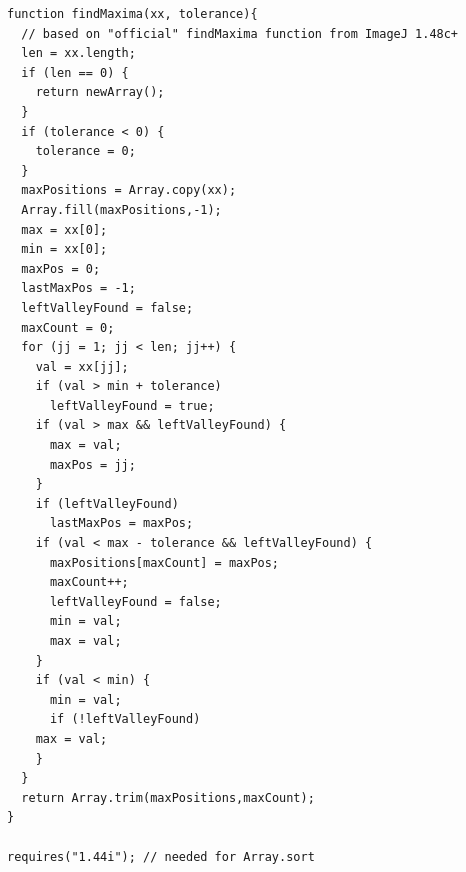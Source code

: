 \documentclass[a4paper]{scrartcl}
\begin{document}
\begin{Verbatim}
function findMaxima(xx, tolerance){
  // based on "official" findMaxima function from ImageJ 1.48c+
  len = xx.length;
  if (len == 0) {
    return newArray();
  }
  if (tolerance < 0) {
    tolerance = 0;
  }
  maxPositions = Array.copy(xx);
  Array.fill(maxPositions,-1);
  max = xx[0];
  min = xx[0];
  maxPos = 0;
  lastMaxPos = -1;
  leftValleyFound = false;
  maxCount = 0;
  for (jj = 1; jj < len; jj++) {
    val = xx[jj];
    if (val > min + tolerance)
      leftValleyFound = true;
    if (val > max && leftValleyFound) {
      max = val;
      maxPos = jj;
    }
    if (leftValleyFound)
      lastMaxPos = maxPos;
    if (val < max - tolerance && leftValleyFound) {
      maxPositions[maxCount] = maxPos;
      maxCount++;
      leftValleyFound = false;
      min = val;
      max = val;
    }
    if (val < min) {
      min = val;
      if (!leftValleyFound)
	max = val;
    }
  }
  return Array.trim(maxPositions,maxCount);
}

requires("1.44i"); // needed for Array.sort


\end{Verbatim}
\end{document}
